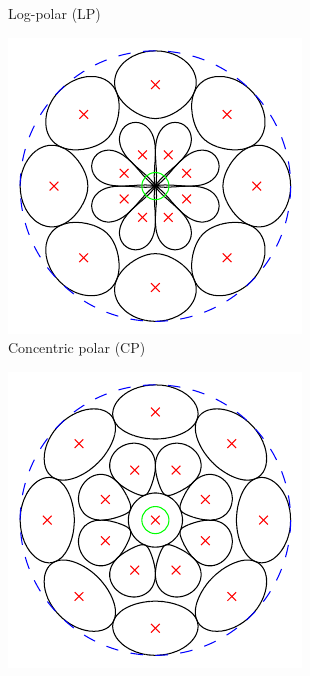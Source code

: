 \documentclass[thesis.tex]{subfiles}
\begin{document}
\begin{figure}[p]
\begin{subfigure}[t]{0.32\textwidth}
		\caption{Log-polar (LP)}
		\label{fig:gridTypeLp}
	\end{subfigure}
	\begin{subfigure}[t]{0.32\textwidth}
		\includegraphics[width=\textwidth]{img/gridType_concentric_polar_polar_gaussian.pdf}
		\caption{Concentric polar (CP)}
		\label{fig:gridTypeCp}
	\end{subfigure}
	\begin{subfigure}[t]{0.32\textwidth}
		\includegraphics[width=\textwidth]{img/gridType_concentric_polar_central_polar_gaussian.pdf}

\end{subfigure}
\end{figure}
\end{document}
